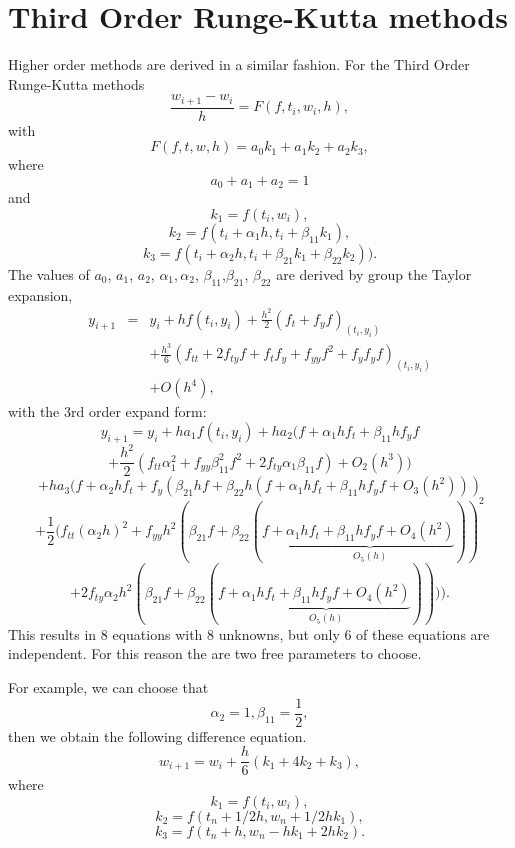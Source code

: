 \section{Third Order Runge-Kutta methods}
Higher order methods are derived in a similar fashion.
For the Third Order Runge-Kutta methods 
\begin{equation}
\frac{w_{i+1}-w_i}{h}=F(f,t_i,w_i,h),
\end{equation}
with
\begin{equation}
F(f,t,w,h)=a_0k_1+a_1k_2+a_2k_3,
\end{equation}
where 
\[a_0+a_1+a_2=1\] 
and
\[k_1=f(t_i,w_i),\]
\[k_2=f(t_i+\alpha_1h,t_i+\beta_{11}k_1),\]
\[k_3=f(t_i+\alpha_2h,t_i+\beta_{21}k_1+\beta_{22}k_2)).\]
The values of $a_0$, $a_1$, $a_2$, $\alpha_1,\alpha_2$, $\beta_{11}$,$\beta_{21}$, $\beta_{22}$ are derived by group the Taylor expansion,
\begin{eqnarray*} y_{i+1}&=&y_{i}+hf(t_{i},y_{i})+{\frac {h^{2}}{2}}(f_{t}+f_{y}f)_{(t_{i},y_{i})}\\
& &+{\frac {h^{3}}{6}}\left(f_{tt}+2f_{ty}f+f_{t}f_{y}+f_{yy}f^{2}+f_{y}f_{y}f\right)_{(t_{i},y_{i})}\\
& &+O(h^{4}),\end{eqnarray*}
with the 3rd order expand form:
\[ y_{i+1}=y_{i}+ha_{1}f(t_{i},y_{i})+ha_{2}(f+\alpha_{1}hf_{t}+\beta_{11}hf_{y}f\]\[+{\frac {h^{2}}{2}}(f_{tt}\alpha_{1}^{2}+f_{yy}\beta_{11}^{2}f^{2}+2f_{ty}\alpha_{1}\beta_{11}f)+O_{2}(h^{3}))\]
\[+ha_{3}(f+\alpha_{2}hf_{t}+f_{y}\left(\beta_{21}hf+\beta_{22}h(f+\alpha_{1}hf_{t}+\beta_{11}hf_{y}f+O_{3}(h^{2}))\right)\] 
\[+{\frac {1}{2}}(f_{tt}(\alpha_{2}h)^{2}+f_{yy}h^{2}(\beta_{21}f+ \beta_{22}(f+\underbrace {\alpha_{1}hf_{t}+\beta_{11}hf_{y}f+O_{4}(h^{2})}_{O_{5}(h)}))^{2}\]
 \[+2f_{ty}\alpha_{2}h^{2}(\beta_{21}f+\beta_{22}(f+\underbrace {\alpha_{1}hf_{t}+\beta_{11}hf_{y}f+O_{4}(h^{2})}_{O_{5}(h)})))).\]
 This results in 8 equations with 8 unknowns, but only 6 of these equations are independent. For this reason the are two free parameters to choose.

For example, we can choose that \[\alpha_{2}=1,\beta_{11}=\frac{1}{2},\]then we obtain the following difference equation.
\[ w_{i+1}=w_{i}+{\frac {h}{6}}(k_{1}+4k_{2}+k_{3}),\]
where
\[k_{1}=f(t_{i},w_{i}),\]
\[ k_{2}=f(t_{n}+1/2h,w_{n}+1/2hk_{1}),\]
\[ k_{3}=f(t_{n}+h,w_{n}-hk_{1}+2hk_{2}).\]

